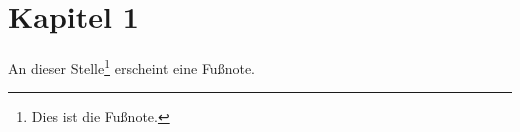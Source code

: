 \section{Kapitel 1}
\label{sec:Kapitel1}

An dieser Stelle\footnote[42]{Dies ist die Fußnote.} erscheint eine Fußnote.

\lipsum[1-6]